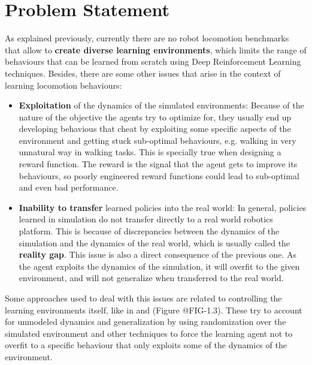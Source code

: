 \figDrlBenchmarks

\section{Problem Statement}
\label{sec:problem}

As explained previously, currently there are no robot locomotion benchmarks that allow
to \textbf{create diverse learning environments}, which limits the range of behaviours that can be learned
from scratch using Deep Reinforcement Learning techniques. Besides, there are some other issues 
that arise in the context of learning locomotion behaviours:

\begin{itemize}
	\item \textbf{Exploitation} of the dynamics of the simulated environments: 
			Because of the nature of the objective the agents try to optimize for, they usually
			end up developing behavious that cheat by exploiting some specific aspects of the environment
			and getting stuck sub-optimal behaviours, e.g. walking in very unnatural way in walking tasks.
			This is specially true when designing a reward function. The reward is the signal
			that the agent gets to improve its behaviours, so poorly engineered reward functions could lead to sub-optimal and even bad performance.
	\item \textbf{Inability to transfer} learned  policies into the real world:
			In general, policies learned in simulation do not transfer directly to a real world robotics
			platform. This is because of discrepancies between the dynamics of the simulation and
			the dynamics of the real world, which is usually called the \textbf{reality gap}.
			This issue is also a direct consequence of the previous one. As the agent exploits the 
			dynamics of the simulation, it will overfit to the given environment, and will 
			not generalize when transferred to the real world.
\end{itemize}

Some approaches used to deal with this issues are related to controlling the learning 
environments itself, like in \citeauthor{GoogleBrainSim2Real} and \citeauthor{OpenAISim2real} (Figure @FIG-1.3). 
These try to account for unmodeled dynamics and generalization by using randomization
over the simulated environment and other techniques to force the learning agent not to 
overfit to a specific behaviour that only exploits some of the dynamics of the environment.

